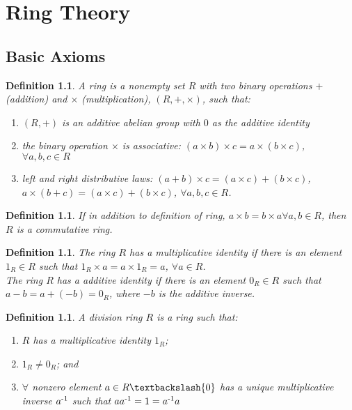 \documentclass[a4paper,sfsidenotes,openany]{tufte-book}
\theoremstyle{theorem}
\newtheorem{definition}[theorem]{Definition}
\begin{document}
\chapter{Ring Theory}
\begin{fullwidth}
\section{Basic Axioms}

\begin{definition}
A \textit{{\color{blue} ring}} is a nonempty set $ R $ with two binary operations $ + $ (addition) and $ \times $ (multiplication), $ (R, +, \times) $, such that:
\begin{enumerate}[label=(\roman*),leftmargin=0pt, itemindent=4em, align=left]
\item $(R, +)$ is an additive abelian group with $0$ as the additive identity
\item the binary operation $\times$ is associative: $(a \times b) \times c = a \times (b \times c) $, $ \forall a, b, c \in R$
\item left and right distributive laws: $(a+b) \times c = (a \times c) + (b \times c) $, $a \times (b+c) = (a \times c) + (b \times c)$, $\forall a, b, c \in R$.
\end{enumerate}
\end{definition}
\>

\begin{definition}
If in addition to definition of ring, $a \times b = b \times a \forall a, b \in R$, then $R$ is a \textit{{\color{blue} commutative ring}}.\\
\end{definition}
\>

\begin{definition}
The ring $R$ has a \textit{{\color{blue} multiplicative identity}} if there is an element $1_R \in R$ such that $1_R \times a = a \times 1_R = a$, $\forall a \in R$.\\
The ring $R$ has a \textit{{\color{blue} additive identity}} if there is an element $0_R \in R$ such that $a-b = a+(-b) = 0_R$, where $-b$ is the \textit{{\color{blue} additive inverse}}.\\
\end{definition}
\>

\begin{definition}
A \textit{{\color{blue} division ring}} $R$ is a ring such that:
\begin{enumerate}[label=(\roman*),leftmargin=0pt, itemindent=4em, align=left]
\item $R$ has a multiplicative identity $1_R$;
\item $1_R \neq 0_R$; and
\item $\forall$ nonzero element $a \in R \textbackslash \{0\}$ has a unique multiplicative inverse $a \textsuperscript{-1}$ such that $aa \textsuperscript{-1} = 1 = a \textsuperscript{-1} a$
\end{enumerate}
\end{definition}
\>


\end{fullwidth}
\end{document}
